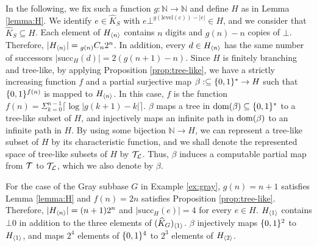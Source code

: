 \documentclass{eptcs-modified}
\begin{document}
In the following, we fix such a function
$g : \mathbb{N} \to \mathbb{N}$ and define $H$ as in Lemma \ref{lemma:H}.
We identify $e \in \widehat{K}_S$ with $e\bot^{g(\mathrm{level}(e)) - |e|}
\in H$, and
we consider that $\widehat{K}_S \subseteq H$.
Each element of  ${{H_{{\langle n\rangle}}}}$ contains $n$ digits and $g(n) - n$ copies of $\bot$.  Therefore, $|{{H_{{\langle n\rangle}}}}| = {}_{g(n)}C_{n}2^n$.
In addition,  every  $d \in  {{H_{{\langle n\rangle}}}}$ has the same number of successors
$|\mathrm{succ}_H(d)| = 2(g(n+1) - n)$.
Since $H$ is finitely branching and tree-like,
by applying Proposition \ref{prop:tree-like}, we have a strictly increasing function $f$
and a partial surjective map $\beta:\subseteq \{0,1\}^* \to H$ such that
$\{0,1\}^{f(n)}$ is mapped to ${{H_{{\langle n\rangle}}}}$.
In this case, $f$ is the function $f(n) = \Sigma_{k=0}^{n-1} {\lceil\log{|g(k+1)-k}|\rceil}$.
$\beta$ maps a tree in $\operatorname{dom}(\beta) \subseteq \{0,1\}^*$ to a tree-like subset of  $H$,
and injectively maps an infinite path in $\operatorname{dom}(\beta) $ to an infinite path in $H$.
By using some bijection $\mathbb{N} \to H$, we can represent a tree-like subset of $H$ by its characteristic function, and we shall denote the represented space of tree-like subsets of $H$ by $\mathcal{T}_\mathcal{L}$.
Thus, $\beta$ induces a computable partial map from $\mathcal{T}$ to $\mathcal{T}_\mathcal{L}$, which we also denote by $\beta$.



\begin{example}

  For the case of the Gray subbase $G$ in Example \ref{ex:gray}, $g(n) = n+1$ satisfies Lemma \ref{lemma:H}
and $f(n) = 2n$ satisfies Proposition \ref{prop:tree-like}.
Therefore,
$|{{H_{{\langle n\rangle}}}}| = (n+1)2^n$ and $|\mathrm{succ}_H(e)| = 4$ for every  $e \in H$.
${{H_{{\langle1\rangle}}}}$ contains $\bot 0$ in addition to the three elements of
${{(\widehat{K}_G)_{{\langle1\rangle}}}}$.
$\beta$ injectively maps $\{0,1\}^{2}$ to ${{H_{{\langle1\rangle}}}}$, and
maps $2^{4}$ elements of $\{0,1\}^{4}$ to $2^{3}$ elements of ${{H_{{\langle2\rangle}}}}$.
\end{example}
\end{document}
